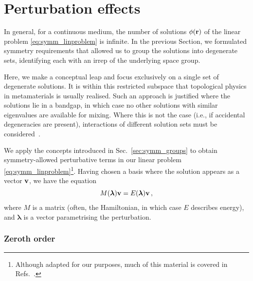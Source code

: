 \section{Perturbation effects} \label{sec:symm_perts}

In general, for a continuous medium, the number of solutions $\phi(\vb{r})$ of the linear problem \eqref{eq:symm_linproblem} is infinite. In the previous Section, we formulated symmetry requirements that allowed us to group the solutions into degenerate sets, identifying each with an irrep of the underlying space group. 

Here, we make a conceptual leap and focus exclusively on a single set of degenerate solutions. It is within this restricted subspace that topological physics in metamaterials is usually realised. Such an approach is justified where the solutions lie in a bandgap, in which case no other solutions with similar eigenvalues are available for mixing. Where this is not the case (i.e., if accidental degeneracies are present), interactions of different solution sets must be considered~\cite{Benalcazar_2020, Cerjan_2020}.

We apply the concepts introduced in Sec.~\ref{sec:symm_groups} to obtain symmetry-allowed perturbative terms in our linear problem \eqref{eq:symm_linproblem}\footnote{Although adapted for our purposes, much of this material is covered in Refs.~\cite{Saba_2017, Saba_2020}.}.
Having chosen a basis where the solution appears as a vector $\vb{v}$, we have the equation
\begin{equation} \label{seq:eigenproblem}
M(\boldsymbol{\lambda})  \vb{v} = E(\boldsymbol{\lambda}) \vb{v} \,,
\end{equation}
where $M$ is a matrix (often, the Hamiltonian, in which case $E$ describes energy), and $\boldsymbol{\lambda}$ is a vector parametrising the perturbation.
\\

\subsubsection{Zeroth order} 

